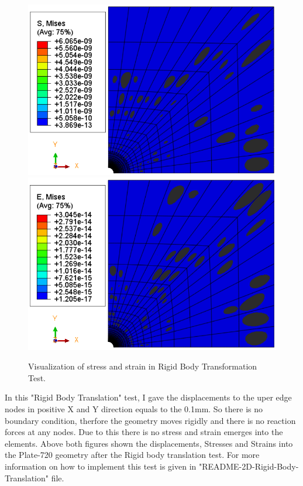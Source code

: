 \documentclass[12pt]{article}
\begin{document}
\begin{figure}[H]
	\begin{center}
		\includegraphics[scale=0.49]{Rigid_body_stress_crop.png} 
		\includegraphics[scale=0.49]{Rigid_body_strain_crop.png} 
	\end{center}
	\caption{Visualization of stress and strain in Rigid Body Transformation Test.} 
\end{figure}
In this "Rigid Body Translation" test, I gave the displacements to the uper edge nodes in positive X and Y direction equals to the 0.1mm. So there is no boundary condition, therfore the geometry moves rigidly and there is no reaction forces at any nodes. Due to this there is no stress and strain emerges into the elements. Above both figures shown the displacements, Stresses and Strains into the Plate-720 geometry after the Rigid body translation test. For more information on how to implement this test is given in "README-2D-Rigid-Body-Translation" file.
\newpage
\end{document}
